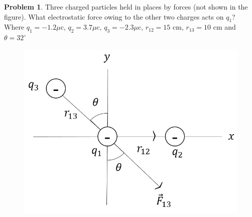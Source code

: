 \documentclass[12pt]{article}
\theoremstyle{definition}
\newtheorem{prob}{Problem}[section]
\begin{document}
\begin{prob}
    Three charged particles held in places by forces (not shown in the figure). What electrostatic force owing to the other two charges acts on $ q_1 $? Where $ q_1 = -1.2\mu  $c, $ q_2=3.7\mu  $c, $ q_3=-2.3\mu  $c, $  r_{12}=15 $ cm, $  r_{13}=10 $ cm and $ \theta = 32^\circ $ 
    \begin{figure}[h]
        \centering
        \includegraphics[scale=.5]{3.png}
        \label{fig:prob1}
    \end{figure}
\end{prob}
\end{document}
